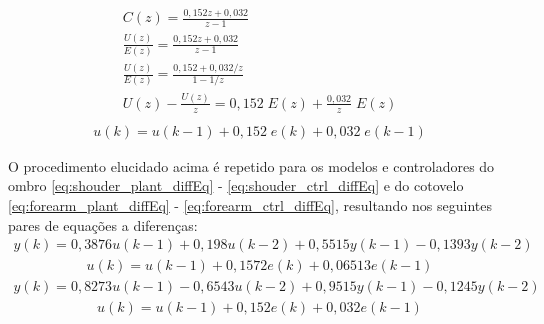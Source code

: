 \begin{equation*}
  \begin{gathered}
    C(z) = \frac{0,152z + 0,032}{z - 1}\\[0.5cm]
    \frac{U(z)}{E(z)} = \frac{0,152z + 0,032}{z - 1}\\[0.5cm]
    \frac{U(z)}{E(z)} = \frac{0,152 + 0,032/z}{1 - 1/z}\\[0.5cm]
    U(z) - \frac{U(z)}{z} = 0,152\;E(z) + \frac{0,032}{z}\;E(z)\\[0.5cm]
  \end{gathered}
  \label{eq:base_ctrl_diffEqIntro}
\end{equation*}
\begin{equation}
  \begin{gathered}
    u(k) = u(k-1) + 0,152\; e(k) + 0,032 \;e(k-1)
  \end{gathered}
  \label{eq:base_ctrl_diffEq}
\end{equation}

O procedimento elucidado acima é repetido para os modelos e controladores do ombro \eqref{eq:shouder_plant_diffEq} - \eqref{eq:shouder_ctrl_diffEq} 
e do cotovelo \eqref{eq:forearm_plant_diffEq} - \eqref{eq:forearm_ctrl_diffEq}, resultando nos seguintes pares de equações a diferenças:
\begin{equation}
  \begin{gathered}
    y(k) = 0,3876 u(k-1) + 0,198 u(k-2) + 0,5515 y(k-1) - 0,1393 y(k-2)
  \end{gathered}
  \label{eq:shouder_plant_diffEq}
\end{equation}
\begin{equation}
  \begin{gathered}
    u(k) = u(k-1) + 0,1572  e(k) + 0,06513 e(k-1)
  \end{gathered}
  \label{eq:shouder_ctrl_diffEq}
\end{equation}
\begin{equation}
  \begin{gathered}
    y(k) = 0,8273 u(k-1) - 0,6543 u(k-2) + 0,9515y(k-1) - 0,1245y(k-2)
  \end{gathered}
  \label{eq:forearm_plant_diffEq}
\end{equation}
\begin{equation}
  \begin{gathered}
    u(k) = u(k-1) + 0,152 e(k) + 0,032 e(k-1)
  \end{gathered}
  \label{eq:forearm_ctrl_diffEq}
\end{equation}


